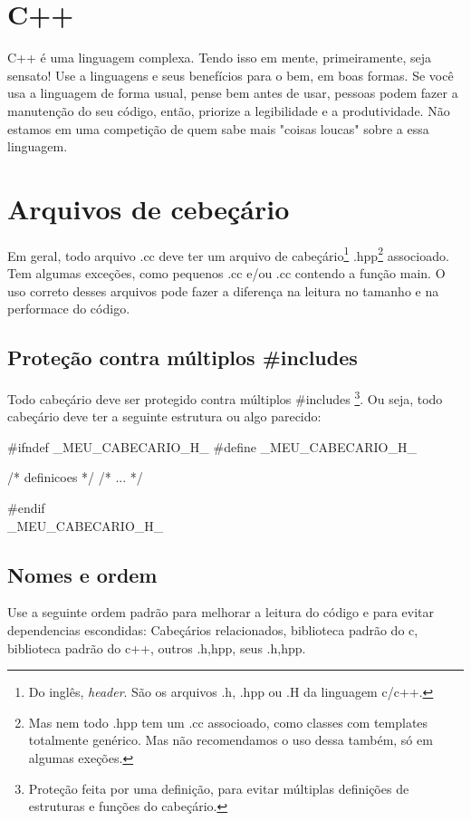 \documentclass{article}
\begin{document}
\section{C++}

C++ é uma linguagem complexa. Tendo isso em mente, primeiramente, seja sensato! Use a linguagens e seus benefícios para o bem, em boas formas. Se você usa a linguagem de forma usual, pense bem antes de usar, pessoas podem fazer a manutenção do seu código, então, priorize a legibilidade e a produtividade. Não estamos em uma competição de quem sabe mais "coisas loucas" sobre a essa linguagem.

\section{Arquivos de cebeçário}

Em geral, todo arquivo .cc deve ter um arquivo de cabeçário\footnote{Do inglês, \emph{header}. São os arquivos .h, .hpp ou .H da linguagem c/c++.} .hpp\footnote{Mas nem todo .hpp tem um .cc associoado, como classes com templates totalmente genérico. Mas não recomendamos o uso dessa também, só em algumas exeções.} associoado. Tem algumas exceções, como pequenos .cc e/ou .cc contendo a função main. O uso correto desses arquivos pode fazer a diferença na leitura no tamanho e na performace do código.

\subsection{Proteção contra múltiplos \#includes}

Todo cabeçário deve ser protegido contra  múltiplos \#includes \footnote{Proteção feita por uma definição, para evitar múltiplas definições de estruturas e funções do cabeçário.}. Ou seja, todo cabeçário deve ter a seguinte estrutura ou algo parecido:

\begin{code}
#ifndef _MEU_CABECARIO_H_
#define _MEU_CABECARIO_H_

/*	definicoes	*/
/*	   ...   	*/

#endif \\_MEU_CABECARIO_H_

\end{code}

\subsection{Nomes e ordem}
Use a seguinte ordem padrão para melhorar a leitura do código e para evitar dependencias escondidas: Cabeçários relacionados, biblioteca padrão do c, biblioteca padrão do c++, outros .{h,hpp}, seus .{h,hpp}.
\end{document}
